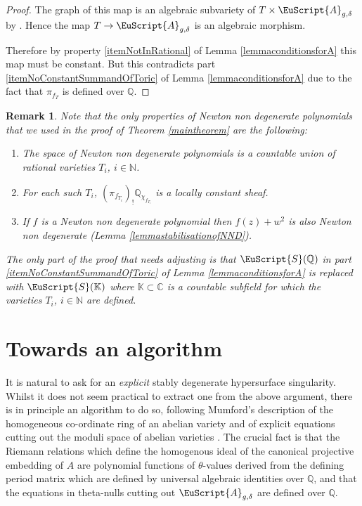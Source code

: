 \documentclass[11pt]{amsart}
\newtheorem{Remark}[thm]{Remark}
\newcommand{\scrA}{\EuScript{A}}
\newcommand{\scrS}{\EuScript{S}}
\newcommand{\bQ}{\mathbb{Q}}
\newcommand{\bC}{\mathbb{C}}
\newcommand{\bN}{\mathbb{N}}
\newcommand{\bK}{\mathbb{K}}
\numberwithin{equation}{section}
\begin{document}
\begin{proof}
	The graph of this map is an algebraic subvariety of $T \times \scrA_{g,\delta}$ by \cite{cattani1995locus}. Hence the map $T \to \scrA_{g,\delta}$ is an algebraic morphism.


	Therefore by property \eqref{itemNotInRational} of Lemma \ref{lemmaconditionsforA} this map must be constant. But this contradicts
	part \eqref{itemNoConstantSummandOfToric} of Lemma \ref{lemmaconditionsforA} due to the fact that
	$\pi_{f_T}$
	is defined over $\bQ$.
\end{proof}



\begin{Remark}
	Note that the only properties of Newton non degenerate polynomials that we used in the proof of Theorem \ref{maintheorem} are the following:
	\begin{enumerate}
		\item The space of Newton non degenerate polynomials is a countable union of rational varieties $T_i$, $i \in \bN$.
		\item For each such $T_i$,
		      $(\pi_{f_{T_i}})_!\bQ_{\chi_{f_{T_i}}}$ is a locally constant sheaf.
		\item If $f$ is a Newton non degenerate polynomial then $f(z) + w^2$ is also Newton non degenerate (Lemma \ref{lemmastabilisationofNND}).
	\end{enumerate}
	The only part of the proof that needs adjusting is that $\scrS(\bQ)$ in part \eqref{itemNoConstantSummandOfToric} of Lemma \ref{lemmaconditionsforA} is replaced with $\scrS(\bK)$ where $\bK \subset \bC$ is a countable subfield for which the varieties $T_i$, $i \in \bN$ are defined.
\end{Remark}



\section{Towards an algorithm}\label{sec:algorithm}

It is natural to ask for an \emph{explicit} stably degenerate hypersurface singularity. Whilst it does not seem practical to extract one from the above argument, there is in principle an algorithm to do so, following Mumford's description of the homogeneous co-ordinate ring of an abelian variety \cite{Mumford1} and of explicit equations cutting out the moduli space of abelian varieties \cite{Mumford2}. The crucial fact is that the Riemann relations which define the homogenous ideal of the canonical projective embedding of $A$ are polynomial functions of $\theta$-values derived from the defining period matrix which are defined by universal algebraic identities over $\bQ$, and that the equations in theta-nulls cutting out $\scrA_{g,\delta}$ are defined over $\bQ$.
\end{document}
